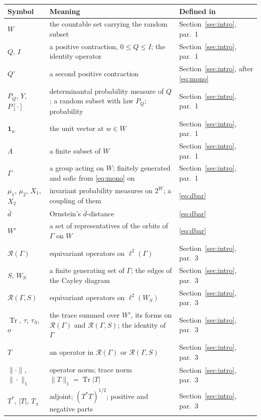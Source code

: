 \documentclass[11pt]{amsart}
\theoremstyle{remark}
\numberwithin{equation}{section}
\newcommand{\Tr}{\operatorname{Tr}}
\newcommand{\dbar}{\bar d}
\newcommand{\R}{\mathcal{R}}
\begin{document}
\begin{center}
\renewcommand{\arraystretch}{1.15}
\begin{tabular}{p{}p{}p{}}
\toprule
Symbol & Meaning & Defined in\\\midrule
$W$ & the countable set carrying the random subset & Section~\ref{sec:intro}, par.~1\\
$Q$, $I$ & a positive contraction, $0\le Q\le I$; the identity operator & Section~\ref{sec:intro}, par.~1\\
$Q'$ & a second positive contraction & Section~\ref{sec:intro}, after \eqref{eq:mono}\\
$P_Q$, $Y$, $P[\cdot]$ & determinantal probability measure of $Q$; a random subset with law $P_Q$; probability & Section~\ref{sec:intro}, par.~1\\
$\mathbf 1_w$ & the unit vector at $w\in W$ & Section~\ref{sec:intro}, par.~1\\
$A$ & a finite subset of $W$ & Section~\ref{sec:intro}, par.~1\\
$\Gamma$ & a group acting on $W$; finitely generated and sofic from \eqref{eq:mono} on & Section~\ref{sec:intro}, par.~1\\
$\mu_1$, $\mu_2$, $X_1$, $X_2$ & invariant probability measures on $2^W$; a coupling of them & \eqref{eq:dbar}\\
$\dbar$ & Ornstein's $\bar d$-distance & \eqref{eq:dbar}\\
$W'$ & a set of representatives of the orbits of $\Gamma$ on $W$ & \eqref{eq:dbar}\\
$\R(\Gamma)$ & equivariant operators on $\ell^2(\Gamma)$ & Section~\ref{sec:intro}, par.~3\\
$S$, $W_S$ & a finite generating set of $\Gamma$; the edges of the Cayley diagram & Section~\ref{sec:intro}, par.~3\\
$\R(\Gamma,S)$ & equivariant operators on $\ell^2(W_S)$ & Section~\ref{sec:intro}, par.~3\\
$\Tr$, $\tau$, $\tau_S$, $o$ & the trace summed over $W'$, its forms on $\R(\Gamma)$ and $\R(\Gamma,S)$; the identity of $\Gamma$ & Section~\ref{sec:intro}, par.~3\\
$T$ & an operator in $\R(\Gamma)$ or $\R(\Gamma,S)$ & Section~\ref{sec:intro}, par.~3\\
$\|\cdot\|$, $\|\cdot\|_1$ & operator norm; trace norm $\|T\|_1=\Tr|T|$ & Section~\ref{sec:intro}, par.~3\\
$T^*$, $|T|$, $T_\pm$ & adjoint; $(T^*T)^{1/2}$; positive and negative parts & Section~\ref{sec:intro}, par.~3\\

\end{tabular}
\end{center}
\end{document}
